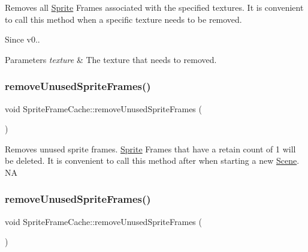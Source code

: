 Removes all \hyperlink{classSprite}{Sprite} Frames associated with the specified textures. It is convenient to call this method when a specific texture needs to be removed. \begin{DoxySince}{Since}
v0..
\end{DoxySince}

\begin{DoxyParams}{Parameters}
{\em texture} & The texture that needs to removed. \\
\hline
\end{DoxyParams}
\mbox{\label{classSpriteFrameCache_a056756d97a724f7d8ef9efd1c9a11074}} 
\subsubsection{\texorpdfstring{remove\+Unused\+Sprite\+Frames()}{removeUnusedSpriteFrames()}\hspace{0.1cm}{\footnotesize\ttfamily [1/2]}}
{\footnotesize\ttfamily void Sprite\+Frame\+Cache\+::remove\+Unused\+Sprite\+Frames (\begin{DoxyParamCaption}{ }\end{DoxyParamCaption})}

Removes unused sprite frames. \hyperlink{classSprite}{Sprite} Frames that have a retain count of 1 will be deleted. It is convenient to call this method after when starting a new \hyperlink{classScene}{Scene}.  NA \mbox{\label{classSpriteFrameCache_a056756d97a724f7d8ef9efd1c9a11074}} 
\subsubsection{\texorpdfstring{remove\+Unused\+Sprite\+Frames()}{removeUnusedSpriteFrames()}\hspace{0.1cm}{\footnotesize\ttfamily [2/2]}}
{\footnotesize\ttfamily void Sprite\+Frame\+Cache\+::remove\+Unused\+Sprite\+Frames (\begin{DoxyParamCaption}{ }\end{DoxyParamCaption})}


